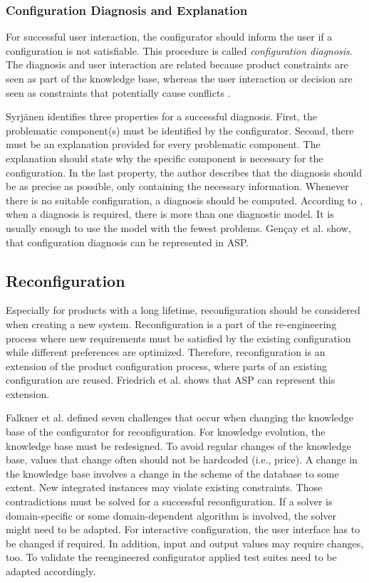 \subsubsection{Configuration Diagnosis and Explanation} 

For successful user interaction, the configurator should inform the user if a configuration is not satisfiable. This procedure is called \textit{configuration diagnosis}. The diagnosis and user interaction are related because product constraints are seen as part of the knowledge base, whereas the user interaction or decision are seen as constraints that potentially cause conflicts \cite{fahakrscscta20a}.\newline

Syrjänen \cite{syrjanen00a} identifies three properties for a successful diagnosis. First, the problematic component(s) must be identified by the configurator. Second, there must be an explanation provided for every problematic component. The explanation should state why the specific component is necessary for the configuration. In the last property, the author describes that the diagnosis should be as precise as possible, only containing the necessary information. Whenever there is no suitable configuration, a diagnosis should be computed. According to  \cite{syrjanen99a}, when a diagnosis is required, there is more than one diagnostic model. It is usually enough to use the model with the fewest problems. Gençay et al. \cite{gescer19a} show, that configuration diagnosis can be represented in ASP.

\subsection{Reconfiguration}

Especially for products with a long lifetime, reconfiguration should be considered when creating a new system. Reconfiguration is a part of the re-engineering process where new requirements must be satisfied by the existing configuration while different preferences are optimized. Therefore, reconfiguration is an extension of the product configuration process, where parts of an existing configuration are reused. Friedrich et al. \cite{frryfahascsc11} shows that ASP can represent this extension. \newline

Falkner et al. \cite{falhas13} defined seven challenges that occur when changing the knowledge base of the configurator for reconfiguration. For knowledge evolution, the knowledge base must be redesigned. To avoid regular changes of the knowledge base, values that change often should not be hardcoded (i.e., price). A change in the knowledge base involves a change in the scheme of the database to some extent. New integrated instances may violate existing constraints. Those contradictions must be solved for a successful reconfiguration. If a solver is domain-specific or some domain-dependent algorithm is involved, the solver might need to be adapted. For interactive configuration, the user interface has to be changed if required. In addition, input and output values may require changes, too. To validate the reengineered configurator applied test suites need to be adapted accordingly.
